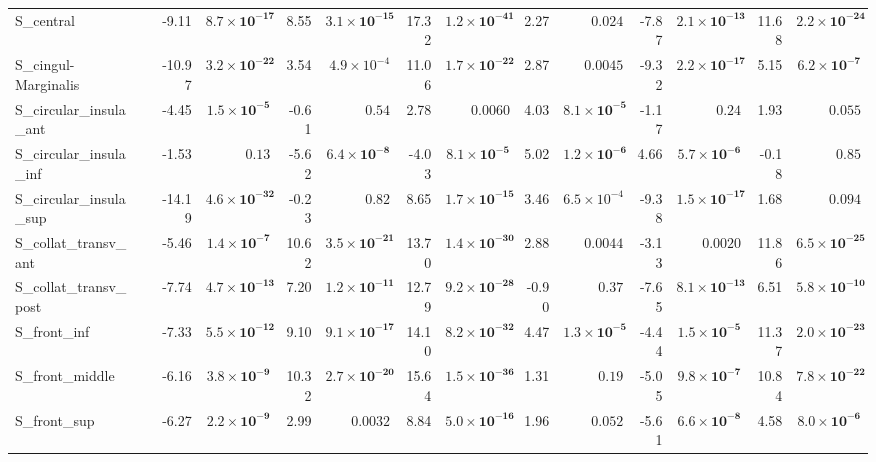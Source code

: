{\begin{longtable}{llrrrrrrrrrrrr}
S\_central &  & -9.11 & $\mathbf{8.7{\times}10^{-17}}$ & 8.55 & $\mathbf{3.1{\times}10^{-15}}$ & 17.32 & $\mathbf{1.2{\times}10^{-41}}$ & 2.27 & $0.024$ & -7.87 & $\mathbf{2.1{\times}10^{-13}}$ & 11.68 & $\mathbf{2.2{\times}10^{-24}}$ \\
S\_cingul-Marginalis &  & -10.97 & $\mathbf{3.2{\times}10^{-22}}$ & 3.54 & $4.9{\times}10^{-4}$ & 11.06 & $\mathbf{1.7{\times}10^{-22}}$ & 2.87 & $0.0045$ & -9.32 & $\mathbf{2.2{\times}10^{-17}}$ & 5.15 & $\mathbf{6.2{\times}10^{-7}}$ \\
S\_circular\_insula\_ant &  & -4.45 & $\mathbf{1.5{\times}10^{-5}}$ & -0.61 & $0.54$ & 2.78 & $0.0060$ & 4.03 & $\mathbf{8.1{\times}10^{-5}}$ & -1.17 & $0.24$ & 1.93 & $0.055$ \\
S\_circular\_insula\_inf &  & -1.53 & $0.13$ & -5.62 & $\mathbf{6.4{\times}10^{-8}}$ & -4.03 & $\mathbf{8.1{\times}10^{-5}}$ & 5.02 & $\mathbf{1.2{\times}10^{-6}}$ & 4.66 & $\mathbf{5.7{\times}10^{-6}}$ & -0.18 & $0.85$ \\
S\_circular\_insula\_sup &  & -14.19 & $\mathbf{4.6{\times}10^{-32}}$ & -0.23 & $0.82$ & 8.65 & $\mathbf{1.7{\times}10^{-15}}$ & 3.46 & $6.5{\times}10^{-4}$ & -9.38 & $\mathbf{1.5{\times}10^{-17}}$ & 1.68 & $0.094$ \\
S\_collat\_transv\_ant &  & -5.46 & $\mathbf{1.4{\times}10^{-7}}$ & 10.62 & $\mathbf{3.5{\times}10^{-21}}$ & 13.70 & $\mathbf{1.4{\times}10^{-30}}$ & 2.88 & $0.0044$ & -3.13 & $0.0020$ & 11.86 & $\mathbf{6.5{\times}10^{-25}}$ \\
S\_collat\_transv\_post &  & -7.74 & $\mathbf{4.7{\times}10^{-13}}$ & 7.20 & $\mathbf{1.2{\times}10^{-11}}$ & 12.79 & $\mathbf{9.2{\times}10^{-28}}$ & -0.90 & $0.37$ & -7.65 & $\mathbf{8.1{\times}10^{-13}}$ & 6.51 & $\mathbf{5.8{\times}10^{-10}}$ \\
S\_front\_inf &  & -7.33 & $\mathbf{5.5{\times}10^{-12}}$ & 9.10 & $\mathbf{9.1{\times}10^{-17}}$ & 14.10 & $\mathbf{8.2{\times}10^{-32}}$ & 4.47 & $\mathbf{1.3{\times}10^{-5}}$ & -4.44 & $\mathbf{1.5{\times}10^{-5}}$ & 11.37 & $\mathbf{2.0{\times}10^{-23}}$ \\
S\_front\_middle &  & -6.16 & $\mathbf{3.8{\times}10^{-9}}$ & 10.32 & $\mathbf{2.7{\times}10^{-20}}$ & 15.64 & $\mathbf{1.5{\times}10^{-36}}$ & 1.31 & $0.19$ & -5.05 & $\mathbf{9.8{\times}10^{-7}}$ & 10.84 & $\mathbf{7.8{\times}10^{-22}}$ \\
S\_front\_sup &  & -6.27 & $\mathbf{2.2{\times}10^{-9}}$ & 2.99 & $0.0032$ & 8.84 & $\mathbf{5.0{\times}10^{-16}}$ & 1.96 & $0.052$ & -5.61 & $\mathbf{6.6{\times}10^{-8}}$ & 4.58 & $\mathbf{8.0{\times}10^{-6}}$ \\

\end{longtable}}
